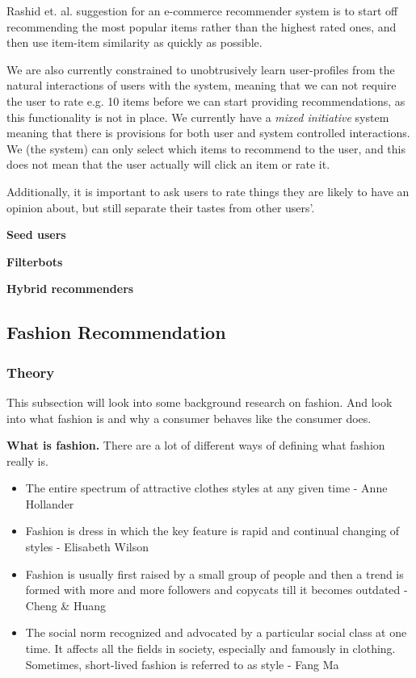 Rashid et. al. \cite{Rashid2002} suggestion for an e-commerce recommender system is to start off recommending the most popular
items rather than the highest rated ones, and then use item-item similarity as quickly as possible.


We are also currently constrained to unobtrusively learn user-profiles from the natural interactions of users with the system, meaning that we can not require the user to rate e.g. 10 items before we can start providing recommendations, as this functionality is not in place. We
currently have a \emph{mixed initiative} system meaning that there is
provisions for both user and system controlled interactions. We (the system)
can only select which items to recommend to the user, and this does not mean
that the user actually will click an item or rate it.

Additionally, it is important to ask users to rate things they
are likely to have an opinion about, but still separate their tastes from other users’.

\textbf{Seed users}


\textbf{Filterbots}

\textbf{Hybrid recommenders}


\subsection{Fashion Recommendation}

\subsubsection{Theory}
This subsection will look into some background research on fashion.
And look into what fashion is and why a consumer behaves like the consumer does.

\textbf{What is fashion.}
There are a lot of different ways of defining what fashion really is.

\begin{itemize}
    \item The entire spectrum of attractive clothes styles at any given time - Anne Hollander
    \item Fashion is dress in which the key feature is rapid and continual changing of styles - Elisabeth Wilson
    \item Fashion is usually first raised by a small group of people and then a trend is formed with more and more followers and copycats till it becomes outdated - Cheng \& Huang
    \item The social norm recognized and advocated by a particular social class at one
    time. It affects all the fields in society, especially and famously in
    clothing. Sometimes, short-lived fashion is referred to as style - Fang Ma \cite{Fang2012}
\end{itemize}

